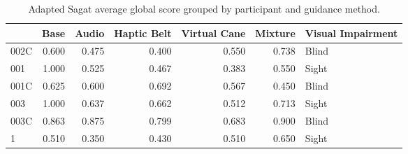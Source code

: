 
\begin{table}[!htb]
\centering
\caption{Adapted Sagat average global score grouped by participant and guidance method.}
\label{tab:sagat_average}
\begin{tabular}{lrrrrrl}
\toprule
{} &  Base &  Audio &  Haptic Belt &  Virtual Cane &  Mixture & Visual Impairment \\
\midrule
002C & 0.600 &  0.475 &        0.400 &         0.550 &    0.738 &             Blind \\
001  & 1.000 &  0.525 &        0.467 &         0.383 &    0.550 &             Sight \\
001C & 0.625 &  0.600 &        0.692 &         0.567 &    0.450 &             Blind \\
003  & 1.000 &  0.637 &        0.662 &         0.512 &    0.713 &             Sight \\
003C & 0.863 &  0.875 &        0.799 &         0.683 &    0.900 &             Blind \\
1    & 0.510 &  0.350 &        0.430 &         0.510 &    0.650 &             Sight \\
\bottomrule
\end{tabular}
\end{table}

